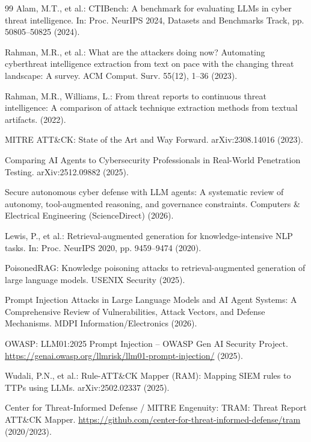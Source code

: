 \documentclass[runningheads]{llncs}
\begin{document}
\begin{thebibliography}{99}
 Alam, M.T., et al.: CTIBench: A benchmark for evaluating LLMs in cyber threat intelligence. In: Proc. NeurIPS 2024, Datasets and Benchmarks Track, pp. 50805--50825 (2024).

 Rahman, M.R., et al.: What are the attackers doing now? Automating cyberthreat intelligence extraction from text on pace with the changing threat landscape: A survey. ACM Comput. Surv. 55(12), 1--36 (2023).

 Rahman, M.R., Williams, L.: From threat reports to continuous threat intelligence: A comparison of attack technique extraction methods from textual artifacts. (2022).

 MITRE ATT\&CK: State of the Art and Way Forward. arXiv:2308.14016 (2023).

 Comparing AI Agents to Cybersecurity Professionals in Real-World Penetration Testing. arXiv:2512.09882 (2025).

 Secure autonomous cyber defense with LLM agents: A systematic review of autonomy, tool-augmented reasoning, and governance constraints. Computers \& Electrical Engineering (ScienceDirect) (2026).

 Lewis, P., et al.: Retrieval-augmented generation for knowledge-intensive NLP tasks. In: Proc. NeurIPS 2020, pp. 9459--9474 (2020).

 PoisonedRAG: Knowledge poisoning attacks to retrieval-augmented generation of large language models. USENIX Security (2025).

 Prompt Injection Attacks in Large Language Models and AI Agent Systems: A Comprehensive Review of Vulnerabilities, Attack Vectors, and Defense Mechanisms. MDPI Information/Electronics (2026).

 OWASP: LLM01:2025 Prompt Injection -- OWASP Gen AI Security Project. \url{https://genai.owasp.org/llmrisk/llm01-prompt-injection/} (2025).

 Wudali, P.N., et al.: Rule-ATT\&CK Mapper (RAM): Mapping SIEM rules to TTPs using LLMs. arXiv:2502.02337 (2025).

 Center for Threat-Informed Defense / MITRE Engenuity: TRAM: Threat Report ATT\&CK Mapper. \url{https://github.com/center-for-threat-informed-defense/tram} (2020/2023).

\end{thebibliography}
\end{document}
